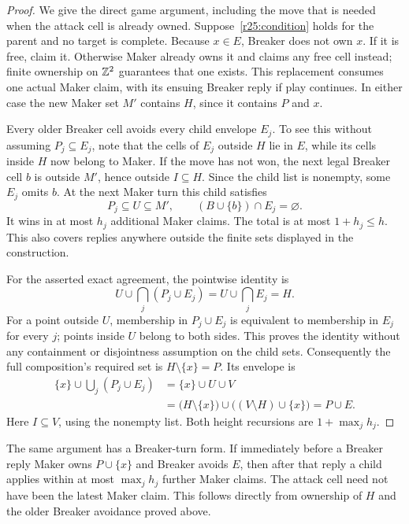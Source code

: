 \begin{proof}
We give the direct game argument, including the move that is needed
when the attack cell is already owned.  Suppose~\eqref{r25:condition}
holds for the parent and no target is complete.  Because $x\in E$,
Breaker does not own $x$.  If it is free, claim it.  Otherwise Maker
already owns it and claims any free cell instead; finite ownership on
$\mathbb Z^2$ guarantees that one exists.  This replacement consumes one
actual Maker claim, with its ensuing Breaker reply if play continues.
In either case the new Maker set $M'$ contains $H$, since it contains
$P$ and $x$.

Every older Breaker cell avoids every child envelope $E_j$.  To see
this without assuming $P_j\subseteq E_j$, note that the cells of $E_j$
outside $H$ lie in $E$, while its cells inside $H$ now belong to
Maker.  If the move has not won, the next legal Breaker cell $b$ is
outside $M'$, hence outside $I\subseteq H$.  Since the child list is
nonempty, some $E_j$ omits $b$.  At the next Maker turn this child
satisfies
\[
 P_j\subseteq U\subseteq M',\qquad
 (B\cup\{b\})\cap E_j=\varnothing.
\]
It wins in at most $h_j$ additional Maker claims.  The total is at most
$1+h_j\leq h$.  This also covers replies anywhere outside the finite
sets displayed in the construction.

For the asserted exact agreement, the pointwise identity is
\begin{equation}\label{r25:intersection-identity}
 U\cup\bigcap_j(P_j\cup E_j)
   =U\cup\bigcap_j E_j=H.
\end{equation}
For a point outside $U$, membership in $P_j\cup E_j$ is equivalent
to membership in $E_j$ for every $j$; points inside $U$ belong to both
sides.  This proves the identity without any containment or
disjointness assumption on the child sets.  Consequently the full
composition's required set is $H\setminus\{x\}=P$.  Its envelope is
\begin{align*}
 \{x\}\cup\bigcup_j(P_j\cup E_j)
   &=\{x\}\cup U\cup V\\
   &=\bigl(H\setminus\{x\}\bigr)
       \cup\bigl((V\setminus H)\cup\{x\}\bigr)=P\cup E.
\end{align*}
Here $I\subseteq V$, using the nonempty list.  Both height recursions
are $1+\max_jh_j$.
\end{proof}

The same argument has a Breaker-turn form.  If immediately before a
Breaker reply Maker owns $P\cup\{x\}$ and Breaker avoids $E$, then
after that reply a child applies within at most $\max_jh_j$ further
Maker claims.  The attack cell need not have been the latest Maker
claim.  This follows directly from ownership of $H$ and the older
Breaker avoidance proved above.

